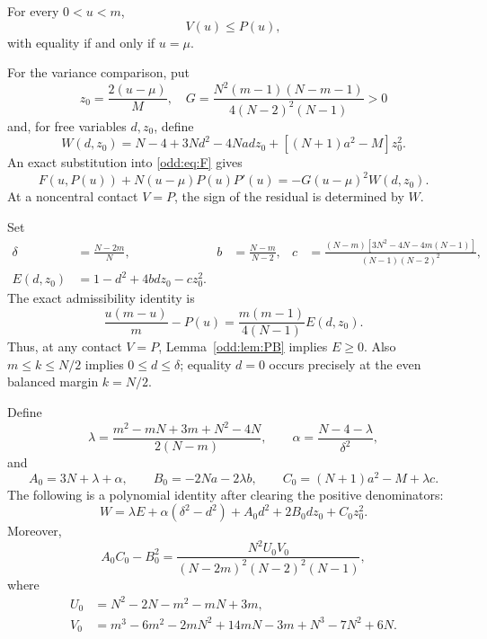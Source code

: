 \begin{lemma}\label{odd:lem:barrier}
For every $0<u<m$,
\begin{equation}\label{odd:eq:barrier}
 \boxed{\quad V(u)\le P(u),\quad}
\end{equation}
with equality if and only if $u=\mu$.
\end{lemma}

For the variance comparison, put
\[
 z_0=\frac{2(u-\mu)}M,\quad
 G=\frac{N^2(m-1)(N-m-1)}{4(N-2)^2(N-1)}>0
\]
and, for free variables $d,z_0$, define
\begin{equation}\label{odd:eq:W}
 W(d,z_0)=N-4+3Nd^2-4Nad z_0+[(N+1)a^2-M]z_0^2.
\end{equation}
An exact substitution into \eqref{odd:eq:F} gives
\begin{equation}\label{odd:eq:residual}
 \boxed{\quad F(u,P(u))+N(u-\mu)P(u)P'(u)
 =-G(u-\mu)^2W(d,z_0).\quad}
\end{equation}
At a noncentral contact $V=P$, the sign of the residual is determined by $W$.

Set
\begin{align*}
 \delta&=\frac{N-2m}{N},&
 b&=\frac{N-m}{N-2},&
 c&=\frac{(N-m)[3N^2-4N-4m(N-1)]}{(N-1)(N-2)^2},\\
 E(d,z_0)&=1-d^2+4bdz_0-cz_0^2.
\end{align*}
The exact admissibility identity is
\begin{equation}\label{odd:eq:E}
 \frac{u(m-u)}m-P(u)=\frac{m(m-1)}{4(N-1)}E(d,z_0).
\end{equation}
Thus, at any contact $V=P$, Lemma~\ref{odd:lem:PB} implies $E\ge0$.
Also $m\le k\le N/2$ implies $0\le d\le\delta$; equality $d=0$ occurs precisely at the even balanced margin $k=N/2$.

Define
\begin{equation}\label{odd:eq:lambda}
 \lambda=\frac{m^2-mN+3m+N^2-4N}{2(N-m)},\qquad
 \alpha=\frac{N-4-\lambda}{\delta^2},
\end{equation}
and
\[
 A_0=3N+\lambda+\alpha,\qquad
 B_0=-2Na-2\lambda b,\qquad
 C_0=(N+1)a^2-M+\lambda c.
\]
The following is a polynomial identity after clearing the positive denominators:
\begin{equation}\label{odd:eq:certificate}
 \boxed{\quad
 W=\lambda E+\alpha(\delta^2-d^2)
   +A_0d^2+2B_0dz_0+C_0z_0^2.\quad}
\end{equation}
Moreover,
\begin{equation}\label{odd:eq:det}
 A_0C_0-B_0^2
 =\frac{N^2U_0V_0}{(N-2m)^2(N-2)^2(N-1)},
\end{equation}
where
\begin{align*}
 U_0&=N^2-2N-m^2-mN+3m,\\
 V_0&=m^3-6m^2-2mN^2+14mN-3m+N^3-7N^2+6N.
\end{align*}

